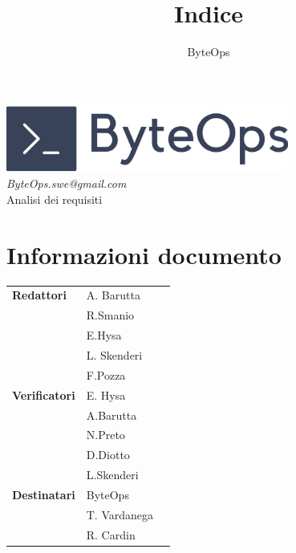 \documentclass{article}
\title{\textbf{\fontsize{28}{6}\selectfont Indice}}
\author{\fontsize{14}{6}\selectfont ByteOps}
\date{}
\begin{document}

\pagestyle{fancy}
\begin{center}
    \includegraphics[width = 0.7\textwidth]{../Images/logo.png} \\
    \vspace{0.2cm}
    \textcolor[RGB]{60, 60, 60}{\textit{ByteOps.swe@gmail.com}} \\
    \vspace{1cm}
    \fontsize{16}{6}\selectfont Analisi dei requisiti\\
    \vspace{0.5cm}
\end{center}

\section*{Informazioni documento}
\def\arraystretch{1.2}
\begin{tabular}{>{\raggedleft\arraybackslash}p{}|>{\raggedright\arraybackslash}p{}c}
    \hline
    \addlinespace
    \textbf{Redattori}    & A. Barutta\\ & R.Smanio\\ & E.Hysa\\ & L. Skenderi\\ & F.Pozza \vspace{10pt} \\
    \textbf{Verificatori} & E. Hysa\\ & A.Barutta\\ & N.Preto\\ & D.Diotto\\ & L.Skenderi \vspace{10pt} \\
    \textbf{Destinatari}  & ByteOps\\ & T. Vardanega   \\ & R. Cardin \vspace{10pt} \\
\end{tabular}
\pagebreak
\end{document}
